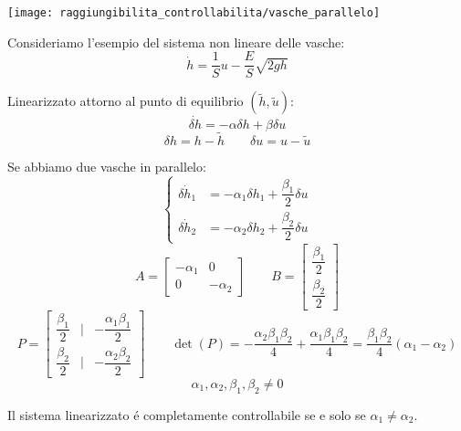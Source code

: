 \documentclass[../main.tex]{subfiles}
\begin{document}
		\begin{mdframed}[style=Exercise]
			\begin{Exercise}[title={Studiare la controllabilit\'a di due vasche in parallelo}, difficulty=2]
				\begin{center}
					\texttt{[image: raggiungibilita\_controllabilita/vasche\_parallelo]}
				\end{center}
				Consideriamo l'esempio del sistema non lineare delle vasche:
				\[
					\dot h = \dfrac{1}{S}u - \dfrac{E}{S}\sqrt{2gh} 
				\]
				
				Linearizzato attorno al punto di equilibrio $ (\tilde h, \tilde u) $:
				\[
					\dot{\delta h} = -\alpha \delta h + \beta \delta u
				\]
				\[
					\delta h = h - \tilde h \qquad \delta u = u - \tilde u
				\]
				
				Se abbiamo due vasche in parallelo:
				\[
					\begin{cases}
						\dot{\delta h_1} &= -\alpha_1 \delta h_1 + \dfrac{\beta_1}{2} \delta u
						\\[1em]
						\dot{\delta h_2} &= -\alpha_2 \delta h_2 + \dfrac{\beta_2}{2} \delta u
					\end{cases}
				\]
				\[
					A =
					\begin{bmatrix}
						-\alpha_1 & 0
						\\
						0 & -\alpha_2
					\end{bmatrix}
					\qquad B =
					\begin{bmatrix}
						\dfrac{\beta_1}{2}
						\\[1em]
						\dfrac{\beta_2}{2}
					\end{bmatrix}
				\]
				\[
					P=
					\begin{bmatrix}
						\dfrac{\beta_1}{2} & | & -\dfrac{\alpha_1 \beta_1}{2}
						\\[1em]
						\dfrac{\beta_2}{2} & | & -\dfrac{\alpha_2 \beta_2}{2}
					\end{bmatrix}\qquad
					\det(P) = -\dfrac{\alpha_2 \beta_1 \beta_2}{4} + \dfrac{\alpha_1 \beta_1 \beta_2}{4} = \dfrac{\beta_1 \beta_2}{4} \left( \alpha_1 - \alpha_2 \right)
				\]
				\[
					\alpha_1, \alpha_2, \beta_1, \beta_2 \neq 0
				\]
				
				Il sistema linearizzato \'e completamente controllabile se e solo se $ \alpha_1 \neq \alpha_2 $.
			\end{Exercise}
		\end{mdframed}
\end{document}
